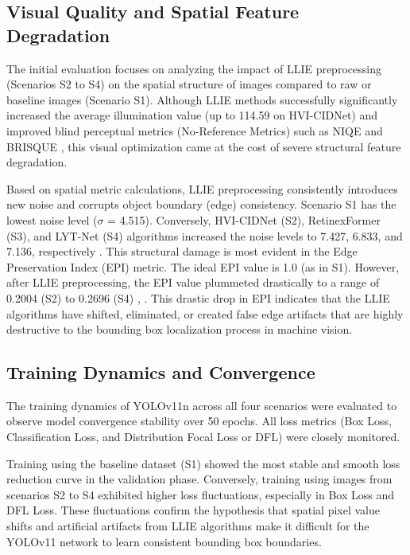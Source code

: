 \documentclass[conference]{IEEEtran}
\begin{document}
\subsection{Visual Quality and Spatial Feature Degradation} The initial evaluation focuses on analyzing the impact of LLIE preprocessing (Scenarios S2 to S4) on the spatial structure of images compared to raw or baseline images (Scenario S1). Although LLIE methods successfully significantly increased the average illumination value (up to 114.59 on HVI-CIDNet) and improved blind perceptual metrics (No-Reference Metrics) such as NIQE and BRISQUE \cite{report2026internal}, this visual optimization came at the cost of severe structural feature degradation.

Based on spatial metric calculations, LLIE preprocessing consistently introduces new noise and corrupts object boundary (edge) consistency. Scenario S1 has the lowest noise level ($\sigma$ = 4.515). Conversely, HVI-CIDNet (S2), RetinexFormer (S3), and LYT-Net (S4) algorithms increased the noise levels to 7.427, 6.833, and 7.136, respectively \cite{report2026internal}. This structural damage is most evident in the Edge Preservation Index (EPI) metric. The ideal EPI value is 1.0 (as in S1). However, after LLIE preprocessing, the EPI value plummeted drastically to a range of 0.2004 (S2) to 0.2696 (S4) \cite{report2026internal}, \cite{metrics2026formulas}. This drastic drop in EPI indicates that the LLIE algorithms have shifted, eliminated, or created false edge artifacts that are highly destructive to the bounding box localization process in machine vision.


\subsection{Training Dynamics and Convergence} The training dynamics of YOLOv11n across all four scenarios were evaluated to observe model convergence stability over 50 epochs. All loss metrics (Box Loss, Classification Loss, and Distribution Focal Loss or DFL) were closely monitored.

Training using the baseline dataset (S1) showed the most stable and smooth loss reduction curve in the validation phase. Conversely, training using images from scenarios S2 to S4 exhibited higher loss fluctuations, especially in Box Loss and DFL Loss. These fluctuations confirm the hypothesis that spatial pixel value shifts and artificial artifacts from LLIE algorithms make it difficult for the YOLOv11 network to learn consistent bounding box boundaries.
\end{document}
